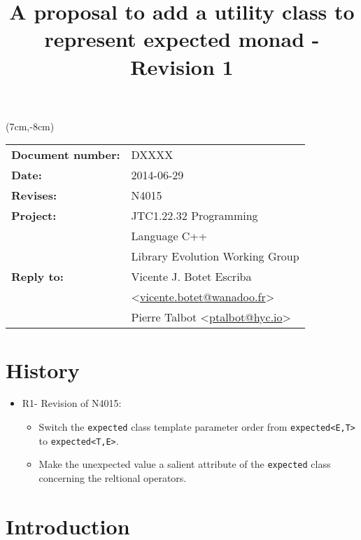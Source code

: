 \documentclass[a4paper,10pt]{article}
\title{A proposal to add a utility class to represent expected monad - Revision 1}
\author{}
\date{}
\newcommand{\cpp}[1]{\lstinline{#1}}
\newcommand{\update}[1]{\colorbox{update_color}{#1}}
\begin{document}
\maketitle
\begin{textblock*}{9cm}(7cm,-8cm)
\begin{tabular}{l l}
\textbf{Document number:} & DXXXX \\
\textbf{Date:}  & 2014-06-29 \\
\textbf{Revises:} & N4015 \\
\textbf{Project:} & JTC1.22.32 Programming \\
 & Language C++ \\
 & Library Evolution Working Group \\
\textbf{Reply to:} & Vicente J. Botet Escriba \\
 & <\href{mailto:vicente.botet@wanadoo.fr}{vicente.botet@wanadoo.fr}> \\
 & Pierre Talbot <\href{mailto:ptalbot@hyc.io}{ptalbot@hyc.io}>
\end{tabular}
\end{textblock*}

\vspace{-6em}
\setcounter{tocdepth}{1}
\tableofcontents

\section{History}
\label{history}

\begin{itemize}
\item \update{R1- Revision of N4015: }
\begin{itemize}
\item \update{Switch the \cpp{expected} class template parameter order from \cpp{expected<E,T>} to \cpp{expected<T,E>}.}
\item \update{Make the unexpected value a salient attribute of the \cpp{expected} class concerning the reltional operators.}
\end{itemize}
\end{itemize}


\section{Introduction}
\end{document}
